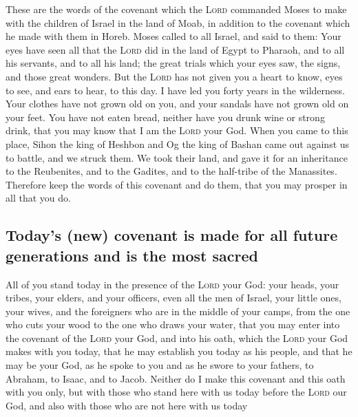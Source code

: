  These are the words of the covenant which the
\textsc{Lord} commanded Moses to make with the children of Israel in the
land of Moab, in addition to the covenant which he made with them in
Horeb.  Moses called to all Israel, and said to them: Your
eyes have seen all that the \textsc{Lord} did in the land of Egypt to
Pharaoh, and to all his servants, and to all his land; 
the great trials which your eyes saw, the signs, and those great
wonders.  But the \textsc{Lord} has not given you a heart
to know, eyes to see, and ears to hear, to this day.  I
have led you forty years in the wilderness. Your clothes have not grown
old on you, and your sandals have not grown old on your feet.
 You have not eaten bread, neither have you drunk wine or
strong drink, that you may know that I am the \textsc{Lord} your God.
 When you came to this place, Sihon the king of Heshbon
and Og the king of Bashan came out against us to battle, and we struck
them.  We took their land, and gave it for an inheritance
to the Reubenites, and to the Gadites, and to the half-tribe of the
Manassites.  Therefore keep the words of this covenant and
do them, that you may prosper in all that you do.

\hypertarget{todays-new-covenant-is-made-for-all-future-generations-and-is-the-most-sacred}{%
\subsection{Today's (new) covenant is made for all future generations
and is the most
sacred}\label{todays-new-covenant-is-made-for-all-future-generations-and-is-the-most-sacred}}

 All of you stand today in the presence of the
\textsc{Lord} your God: your heads, your tribes, your elders, and your
officers, even all the men of Israel,  your little ones,
your wives, and the foreigners who are in the middle of your camps, from
the one who cuts your wood to the one who draws your water,
 that you may enter into the covenant of the
\textsc{Lord} your God, and into his oath, which the \textsc{Lord} your
God makes with you today,  that he may establish you
today as his people, and that he may be your God, as he spoke to you and
as he swore to your fathers, to Abraham, to Isaac, and to Jacob.
 Neither do I make this covenant and this oath with you
only,  but with those who stand here with us today before
the \textsc{Lord} our God, and also with those who are not here with us
today

